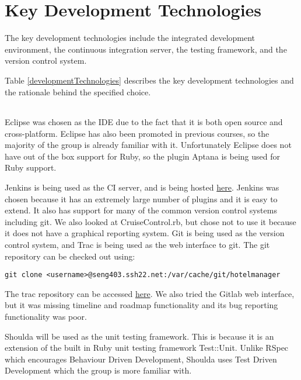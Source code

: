 \section{Key Development Technologies}

The key development technologies include the integrated development environment, the continuous integration server, the testing framework, and the version control system.

Table \ref{developmentTechnologies} describes the key development technologies and the rationale behind the specified choice.

\begin{table}[!h]
	\begin{tabular}{|l|l|l|}
	\end{tabular}
\end{table}

Eclipse was chosen as the IDE due to the fact that it is both open source and cross-platform. Eclipse has also been promoted in previous courses, so the majority of the group is already familiar with it. Unfortunately Eclipse does not have out of the box support for Ruby, so the plugin Aptana is being used for Ruby support.

Jenkins is being used as the CI server, and is being hosted \href{http://seng403.ssh22.net/jenkins}{here}. Jenkins was chosen because it has an extremely large number of plugins and it is easy to extend. It also has support for many of the common version control systems including git. We also looked at CruiseControl.rb, but chose not to use it because it does not have a graphical reporting system. Git is being used as the version control system, and Trac is being used as the web interface to git. The git repository can be checked out using:
\lstset{language=bash}
\begin{lstlisting}
git clone <username>@seng403.ssh22.net:/var/cache/git/hotelmanager
\end{lstlisting}
The trac repository can be accessed \href{http://seng403.ssh22.net/trac}{here}. We also tried the Gitlab web interface, but it was missing timeline and roadmap functionality and its bug reporting functionality was poor.

Shoulda will be used as the unit testing framework. This is because it is an extension of the built in Ruby unit testing framework Test::Unit. Unlike RSpec which encourages Behaviour Driven Development, Shoulda uses Test Driven Development which the group is more familiar with.
